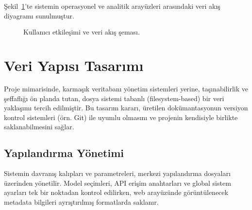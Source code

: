 Şekil~\ref{fig:ui-flow}'te sistemin operasyonel ve analitik arayüzleri arasındaki veri akış diyagramı sunulmuştur.

\begin{figure}[H]
    \centering
    \caption{Kullanıcı etkileşimi ve veri akış şeması.}
    \label{fig:ui-flow}
\end{figure}

\section{Veri Yapısı Tasarımı}
\label{sec:veri-yapisi-tasarimi}

Proje mimarisinde, karmaşık veritabanı yönetim sistemleri yerine, taşınabilirlik ve şeffaflığı ön planda tutan, dosya sistemi tabanlı (filesystem-based) bir veri yaklaşımı tercih edilmiştir. Bu tasarım kararı, üretilen dokümantasyonun versiyon kontrol sistemleri (örn. Git) ile uyumlu olmasını ve projenin kendisiyle birlikte saklanabilmesini sağlar.

\subsection{Yapılandırma Yönetimi}
Sistemin davranış kalıpları ve parametreleri, merkezi yapılandırma dosyaları üzerinden yönetilir. Model seçimleri, API erişim anahtarları ve global sistem ayarları tek bir noktadan kontrol edilirken, web arayüzünde görüntülenecek metadata bilgileri ayrıştırılmış formatlarda saklanır.

